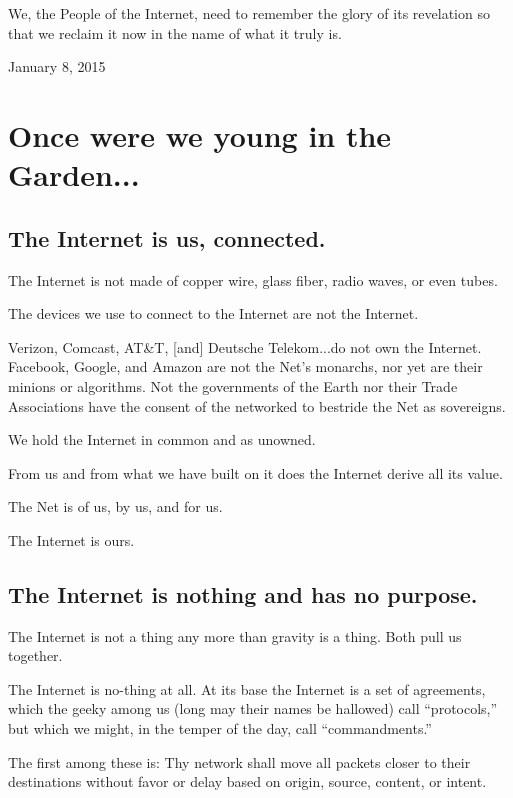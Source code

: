 \documentclass[letterpaper,12pt,english]{sphinxmanual}
\begin{document}
We, the People of the Internet, need to remember the glory of its revelation so that we reclaim it now in the name of what it truly is.

January 8, 2015


\section{Once were we young in the Garden...}
\label{2015newclues:once-were-we-young-in-the-garden}

\subsection{The Internet is us, connected.}
\label{2015newclues:the-internet-is-us-connected}
The Internet is not made of copper wire, glass fiber, radio waves, or even tubes.

The devices we use to connect to the Internet are not the Internet.

Verizon, Comcast, AT\&T, {[}and{]} Deutsche Telekom...do not own the Internet. Facebook, Google, and Amazon are not the Net's monarchs, nor yet are their minions or algorithms. Not the governments of the Earth nor their Trade Associations have the consent of the networked to bestride the Net as sovereigns.

We hold the Internet in common and as unowned.

From us and from what we have built on it does the Internet derive all its value.

The Net is of us, by us, and for us.

The Internet is ours.


\subsection{The Internet is nothing and has no purpose.}
\label{2015newclues:the-internet-is-nothing-and-has-no-purpose}
The Internet is not a thing any more than gravity is a thing. Both pull us together.

The Internet is no-thing at all. At its base the Internet is a set of agreements, which the geeky among us (long may their names be hallowed) call ``protocols,'' but which we might, in the temper of the day, call ``commandments.''

The first among these is: Thy network shall move all packets closer to their destinations without favor or delay based on origin, source, content, or intent.
\end{document}
